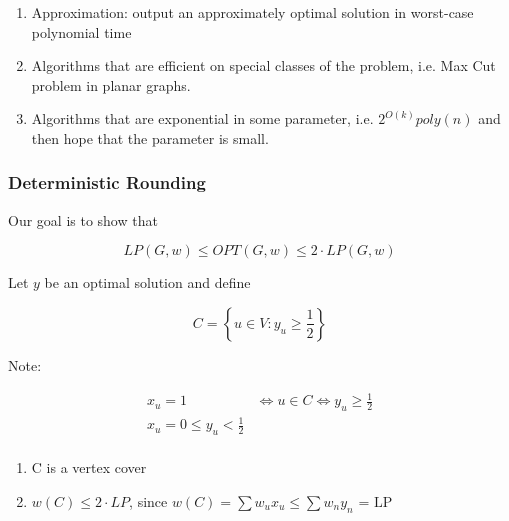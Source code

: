 \documentclass[../notes.tex]{subfiles}
\begin{document}
\begin{enumerate}
    \item Approximation: output an approximately optimal solution in worst-case polynomial time
    \item Algorithms that are efficient on special classes of the problem, i.e. Max Cut problem in planar graphs.
    \item Algorithms that are exponential in some parameter, i.e. $ 2^{O(k)} poly(n) $ and then hope that the parameter is small.
\end{enumerate}

\subsubsection{Deterministic Rounding}
Our goal is to show that 

\begin{equation} 
    LP(G, w) \le OPT(G, w) \le 2 \cdot  LP(G, w)
\end{equation}

Let $ y $ be an optimal solution and define

\begin{equation}
    C = \left\{  u \in V : y_u \ge  \frac{1}{2} \right\} 
\end{equation}

Note:

\begin{equation}
    \begin{split}
        x_u = 1 &\Leftrightarrow u \in C \Leftrightarrow y_u \ge  \frac{1}{2} \\
        x_u = 0 \le  y_u < \frac{1}{2}\\
    \end{split}
    \label{eq:}
\end{equation}

\begin{enumerate}
    \item C is a vertex cover
    \item $ w(C) \le  2 \cdot  LP$, since $ w(C) = \sum w_u x_u \le \sum w_n y_n \text{ = LP } $
\end{enumerate}

\end{document}
